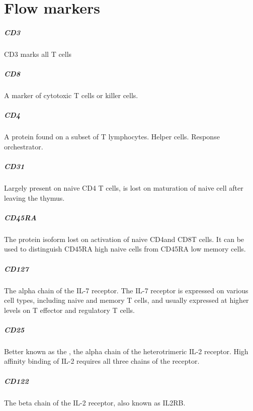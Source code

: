 \chapter{\label{appendix:flowsorting}{Flow markers}}


\paragraph{CD3}
CD3 marks all T cells

\paragraph{CD8}
A marker of cytotoxic T cells or killer cells.

\paragraph{CD4}
A protein found on a subset of T lymphocytes.
Helper cells.
Response orchestrator.

\paragraph{CD31}
Largely present on naive CD4 T cells, is lost on maturation of naive cell after leaving the thymus.

\paragraph{CD45RA}
The protein isoform lost on activation of naive CD4\positive and CD8\positive T cells.
It can be used to distinguish CD45RA high naive cells from CD45RA low memory cells.

\paragraph{CD127}
The alpha chain of the IL-7 receptor.
The IL-7 receptor is expressed on various cell types, including naive and memory T cells,
and usually expressed at higher levels on T effector and regulatory T cells.

\paragraph{CD25}
Better known as the , the alpha chain of the heterotrimeric IL-2 receptor.
High affinity binding of IL-2 requires all three chains of the receptor.

\paragraph{CD122}
The beta chain of the IL-2 receptor, also known as IL2RB.

